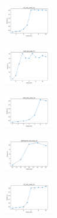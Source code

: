 \vspace*{\fill}
\newpage
\vspace*{\fill}

\begin{figure}[H]    
    \centering
    \begin{subfigure}
        \centering
        \includegraphics[width=0.234\textwidth]{img/es/iris_set_const_10_949004259_time.png}
    \end{subfigure}
    \hfill
    \begin{subfigure}
        \centering
        \includegraphics[width=0.234\textwidth]{img/es/ecoli_set_const_10_949004259_time.png}
    \end{subfigure}
    \hfill
    \begin{subfigure}
        \centering
        \includegraphics[width=0.234\textwidth]{img/es/rand_set_const_10_949004259_time.png}
    \end{subfigure}
    \hfill
    \begin{subfigure}
        \centering
        \includegraphics[width=0.234\textwidth]{img/es/newthyroid_set_const_10_949004259_time.png}
    \end{subfigure}
    \hfill
    \begin{subfigure}
        \centering
        \includegraphics[width=0.234\textwidth]{img/es/iris_set_const_10_589741062_time.png}

\end{subfigure}
\end{figure}
